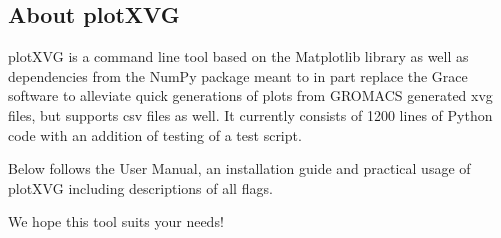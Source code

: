 \subsection*{About plotXVG}
plotXVG is a command line tool based on the Matplotlib library as well as dependencies from the NumPy package meant to in part replace the Grace software to alleviate quick generations of plots from GROMACS generated xvg files, but supports csv files as well. It currently consists of 1200 lines of Python code with an addition of testing of a test script.

Below follows the User Manual, an installation guide and practical usage of plotXVG including descriptions of all flags.

We hope this tool suits your needs!
